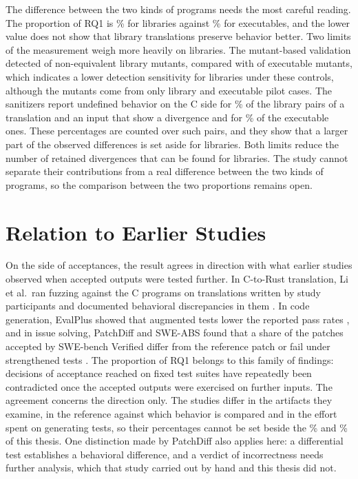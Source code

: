 The difference between the two kinds of programs needs the most careful reading. The proportion of RQ1 is \rqFPLibAllPct\% for libraries against \rqFPExeAllPct\% for executables, and the lower value does not show that library translations preserve behavior better. Two limits of the measurement weigh more heavily on libraries. The mutant-based validation detected \sMutLibK{} of \sMutLibN{} non-equivalent library mutants, compared with \sMutExeK{} of \sMutExeN{} executable mutants, which indicates a lower detection sensitivity for libraries under these controls, although the mutants come from only \sMutLibNCases{} library and \sMutExeNCases{} executable pilot cases. The sanitizers report undefined behavior on the C side for \rqUbDivLibAllPct\% of the library pairs of a translation and an input that show a divergence and for \rqUbDivExeAllPct\% of the executable ones. These percentages are counted over such pairs, and they show that a larger part of the observed differences is set aside for libraries. Both limits reduce the number of retained divergences that can be found for libraries. The study cannot separate their contributions from a real difference between the two kinds of programs, so the comparison between the two proportions remains open.

\section{Relation to Earlier Studies}\label{sec:d-relation}

On the side of acceptances, the result agrees in direction with what earlier studies observed when accepted outputs were tested further. In C-to-Rust translation, Li et al.\ ran fuzzing against the C programs on translations written by study participants and documented behavioral discrepancies in them \cite{li2025userstudy}. In code generation, EvalPlus showed that augmented tests lower the reported pass rates \cite{liu2023evalplus}, and in issue solving, PatchDiff and SWE-ABS found that a share of the patches accepted by SWE-bench Verified differ from the reference patch or fail under strengthened tests \cite{wang2026patchdiff,yu2026sweabs}. The proportion of RQ1 belongs to this family of findings: decisions of acceptance reached on fixed test suites have repeatedly been contradicted once the accepted outputs were exercised on further inputs. The agreement concerns the direction only. The studies differ in the artifacts they examine, in the reference against which behavior is compared and in the effort spent on generating tests, so their percentages cannot be set beside the \rqFPExeAllPct\% and \rqFPLibAllPct\% of this thesis. One distinction made by PatchDiff also applies here: a differential test establishes a behavioral difference, and a verdict of incorrectness needs further analysis, which that study carried out by hand and this thesis did not.

